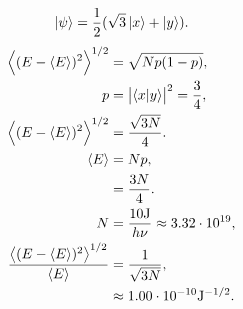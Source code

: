 \documentclass[a4paper,12pt,twoside]{article}
\begin{document}
\begin{multicols*}{2}
\subsection{}%
\begin{equation}
    \ket{\psi} = \frac{1}{2} (\sqrt{3} \ket{x} + \ket{y}).
\end{equation}
\begin{align}
    \ev{(E-\ev{E})^2}^{1/2} &= \sqrt{Np(1-p)},\\
    p &= \abs{\ip{x}{y}}^2 = \frac{3}{4},\\
    \ev{(E-\ev{E})^2}^{1/2} &= \frac{\sqrt{3N}}{4}.\\
    \ev{E} &= Np,\\
    &= \frac{3N}{4}.\\
    N &= \frac{10\mathrm{J}}{h\nu} \approx 3.32 \cdot 10^{19},\\
    \frac{\ev{(E-\ev{E})^2}^{1/2}}{\ev{E}} &= \frac{1}{\sqrt{3N}},\\
    &\approx 1.00 \cdot 10^{-10}\mathrm{J^{-1/2}}.
\end{align}

\nocite{*}
\printbibliography[title={References},heading=bibnumbered]


\end{multicols*}
\end{document}
